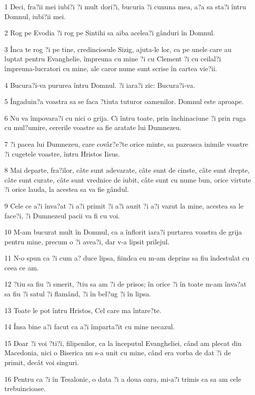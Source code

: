 \par 1 Deci, fra?ii mei iubi?i ?i mult dori?i, bucuria ?i cununa mea, a?a sa sta?i întru Domnul, iubi?ii mei.
\par 2 Rog pe Evodia ?i rog pe Sintihi sa aiba acelea?i gânduri în Domnul.
\par 3 Înca te rog ?i pe tine, credinciosule Sizig, ajuta-le lor, ca pe unele care au luptat pentru Evanghelie, împreuna cu mine ?i cu Clement ?i cu ceilal?i împreuna-lucratori cu mine, ale caror nume sunt scrise în cartea vie?ii.
\par 4 Bucura?i-va pururea întru Domnul. ?i iara?i zic: Bucura?i-va.
\par 5 Îngaduin?a voastra sa se faca ?tiuta tuturor oamenilor. Domnul este aproape.
\par 6 Nu va împovara?i cu nici o grija. Ci întru toate, prin închinaciune ?i prin ruga cu mul?umire, cererile voastre sa fie aratate lui Dumnezeu.
\par 7 ?i pacea lui Dumnezeu, care covâr?e?te orice minte, sa pazeasca inimile voastre ?i cugetele voastre, întru Hristos Iisus.
\par 8 Mai departe, fra?ilor, câte sunt adevarate, câte sunt de cinste, câte sunt drepte, câte sunt curate, câte sunt vrednice de iubit, câte sunt cu nume bun, orice virtute ?i orice lauda, la acestea sa va fie gândul.
\par 9 Cele ce a?i înva?at ?i a?i primit ?i a?i auzit ?i a?i vazut la mine, acestea sa le face?i, ?i Dumnezeul pacii va fi cu voi.
\par 10 M-am bucurat mult în Domnul, ca a înflorit iara?i purtarea voastra de grija pentru mine, precum o ?i avea?i, dar v-a lipsit prilejul.
\par 11 N-o spun ca ?i cum a? duce lipsa, fiindca eu m-am deprins sa fiu îndestulat cu ceea ce am.
\par 12 ?tiu sa fiu ?i smerit, ?tiu sa am ?i de prisos; în orice ?i în toate m-am înva?at sa fiu ?i satul ?i flamând, ?i în bel?ug ?i în lipsa.
\par 13 Toate le pot întru Hristos, Cel care ma întare?te.
\par 14 Însa bine a?i facut ca a?i împarta?it cu mine necazul.
\par 15 Doar ?i voi ?ti?i, filipenilor, ca la începutul Evangheliei, când am plecat din Macedonia, nici o Biserica nu s-a unit cu mine, când era vorba de dat ?i de primit, decât voi singuri.
\par 16 Pentru ca ?i în Tesalonic, o data ?i a doua oara, mi-a?i trimis ca sa am cele trebuincioase.
